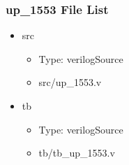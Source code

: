 \subsubsection{up\_1553 File List}
\begin{itemize}
\item src
	\begin{itemize}
	\item[$\space$] Type: verilogSource
	\item src/up\_1553.v
	\end{itemize}
\item tb
	\begin{itemize}
	\item[$\space$] Type: verilogSource
	\item tb/tb\_up\_1553.v
	\end{itemize}
\end{itemize}
